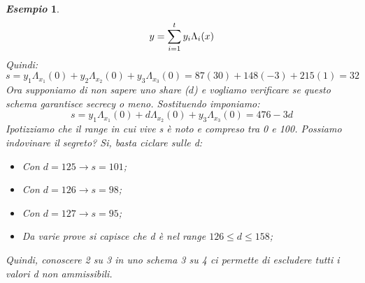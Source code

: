 \documentclass{book}
\newtheorem{esempio}{\emph{Esempio}}
\begin{document}
\begin{esempio}
\begin{equation*}
		\centering
		y=\sum_{i=1}^{t}{y_{i}\Lambda_{i}(x)}
	\end{equation*}
	Quindi:
	\begin{equation*}
		s=y_{1}\Lambda_{x_{1}}(0)+y_{2}\Lambda_{x_{2}}(0)+y_{3}\Lambda_{x_{3}}(0)=87(30)+148(-3)+215(1)=32
	\end{equation*}
	Ora supponiamo di non sapere uno share \emph(\(d\)) e vogliamo verificare se questo schema garantisce secrecy o meno\@. Sostituendo imponiamo:
	\begin{equation*}
		s=y_{1}\Lambda_{x_{1}}(0)+d\Lambda_{x_{2}}(0)+y_{3}\Lambda_{x_{3}}(0)= 476-3d
	\end{equation*}
	Ipotizziamo che il range in cui vive s è noto e compreso tra 0 e 100\@. Possiamo indovinare il segreto? Si, basta ciclare sulle d:\begin{itemize}
		\item Con \(d=125\rightarrow s=101\);
		\item Con \(d=126\rightarrow s=98\);
		\item Con \(d=127\rightarrow s=95\);
		\item Da varie prove si capisce che d è nel range \(126\leq d\leq 158\);
	\end{itemize}
	Quindi, conoscere 2 su 3 in uno schema 3 su 4 ci permette di escludere tutti i valori d non ammissibili\@.
\end{esempio}
\end{document}
